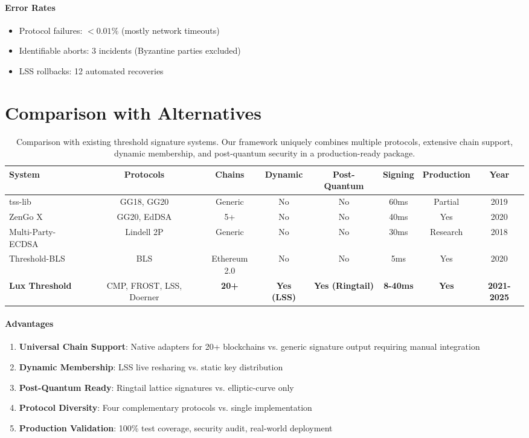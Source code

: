 \documentclass[11pt,twocolumn]{article}
\begin{document}
\paragraph{Error Rates}
\begin{itemize}
\item Protocol failures: $< 0.01\%$ (mostly network timeouts)
\item Identifiable aborts: 3 incidents (Byzantine parties excluded)
\item LSS rollbacks: 12 automated recoveries
\end{itemize}

\section{Comparison with Alternatives}

\begin{table*}[t]
\centering
\small
\begin{tabular}{@{}lccccccc@{}}
\toprule
\textbf{System} & \textbf{Protocols} & \textbf{Chains} & \textbf{Dynamic} & \textbf{Post-Quantum} & \textbf{Signing} & \textbf{Production} & \textbf{Year} \\
\midrule
tss-lib \cite{tsslib} & GG18, GG20 & Generic & No & No & 60ms & Partial & 2019 \\
ZenGo X \cite{zengo} & GG20, EdDSA & 5+ & No & No & 40ms & Yes & 2020 \\
Multi-Party-ECDSA \cite{mpecdsa} & Lindell 2P & Generic & No & No & 30ms & Research & 2018 \\
Threshold-BLS \cite{tbls} & BLS & Ethereum 2.0 & No & No & 5ms & Yes & 2020 \\
\midrule
\textbf{Lux Threshold} & CMP, FROST, LSS, Doerner & \textbf{20+} & \textbf{Yes (LSS)} & \textbf{Yes (Ringtail)} & \textbf{8-40ms} & \textbf{Yes} & \textbf{2021-2025} \\
\bottomrule
\end{tabular}
\caption{Comparison with existing threshold signature systems. Our framework uniquely combines multiple protocols, extensive chain support, dynamic membership, and post-quantum security in a production-ready package.}
\label{tab:comparison}
\end{table*}

\paragraph{Advantages}
\begin{enumerate}
\item \textbf{Universal Chain Support}: Native adapters for 20+ blockchains vs. generic signature output requiring manual integration
\item \textbf{Dynamic Membership}: LSS live resharing vs. static key distribution
\item \textbf{Post-Quantum Ready}: Ringtail lattice signatures vs. elliptic-curve only
\item \textbf{Protocol Diversity}: Four complementary protocols vs. single implementation
\item \textbf{Production Validation}: 100\% test coverage, security audit, real-world deployment
\end{enumerate}
\end{document}
